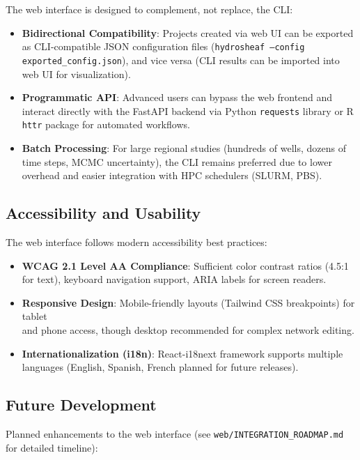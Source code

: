 The web interface is designed to complement, not replace, the CLI:

\begin{itemize}
	\item \textbf{Bidirectional Compatibility}: Projects created via web UI can be exported as CLI-compatible JSON configuration files (\texttt{hydrosheaf --config}\\
	\texttt{exported\_config.json}), and vice versa (CLI results can be imported into web UI for visualization).
	\item \textbf{Programmatic API}: Advanced users can bypass the web frontend and interact directly with the FastAPI backend via Python \texttt{requests} library or R \texttt{httr} package for automated workflows.
	\item \textbf{Batch Processing}: For large regional studies (hundreds of wells, dozens of time steps, MCMC uncertainty), the CLI remains preferred due to lower overhead and easier integration with HPC schedulers (SLURM, PBS).
\end{itemize}

\subsection{Accessibility and Usability}

The web interface follows modern accessibility best practices:
\begin{itemize}
	\item \textbf{WCAG 2.1 Level AA Compliance}: Sufficient color contrast ratios (4.5:1 for text), keyboard navigation support, ARIA labels for screen readers.
	\item \textbf{Responsive Design}: Mobile-friendly layouts (Tailwind CSS breakpoints) for tablet\\and phone access, though desktop recommended for complex network editing.
	\item \textbf{Internationalization (i18n)}: React-i18next framework supports multiple languages (English, Spanish, French planned for future releases).
\end{itemize}

\subsection{Future Development}

Planned enhancements to the web interface (see \texttt{web/INTEGRATION\_ROADMAP.md} for detailed timeline):


